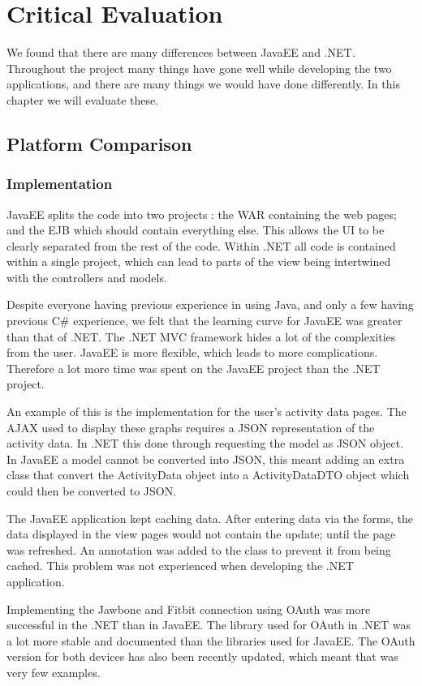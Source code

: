 \chapter{Critical Evaluation}

We found that there are many differences between JavaEE and .NET. Throughout the project many things have gone well while developing the two applications, and there are many things we would have done differently. In this chapter we will evaluate these.

\section{Platform Comparison}

\subsection{Implementation}
JavaEE splits the code into two projects : the WAR containing the web pages; and the EJB which should contain everything else. This allows the UI to be clearly separated from the rest of the code. Within .NET all code is contained within a single project, which can lead to parts of the view being intertwined with the controllers and models.

Despite everyone having previous experience in using Java, and only a few having previous C\# experience, we felt that the learning curve for JavaEE was greater than that of .NET. The .NET MVC framework hides a lot of the complexities from the user. JavaEE is more flexible, which leads to more complications. Therefore a lot more time was spent on the JavaEE project than the .NET project.

An example of this is the implementation for the user's activity data pages. The AJAX used to display these graphs requires a JSON representation of the activity data. In .NET this done through requesting the model as JSON object. In JavaEE a model cannot be converted into JSON, this meant adding an extra class that convert the ActivityData object into a ActivityDataDTO object which could then be converted to JSON. 

The JavaEE application kept caching data. After entering data via the forms, the data displayed in the view pages would not contain the update; until the page was refreshed. An annotation was added to the class to prevent it from being cached. This problem was not experienced when developing the .NET application.

Implementing the Jawbone and Fitbit connection using OAuth was more successful in the .NET than in JavaEE. The library used for OAuth in .NET was a lot more stable and documented than the libraries used for JavaEE. The OAuth version for both devices has also been recently updated, which meant that was very few examples. 

